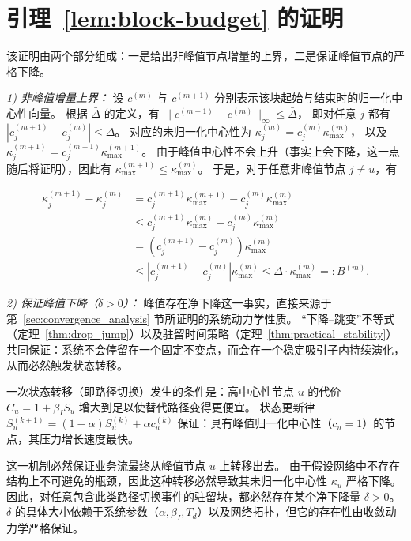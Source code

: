 \documentclass[journal]{IEEEtran}
\theoremstyle{plain}
\theoremstyle{definition}
\begin{document}

\section{引理~\ref{lem:block-budget} 的证明}
\label{app:proof_lem_block_budget}
\begin{IEEEproof}
该证明由两个部分组成：一是给出非峰值节点增量的上界，二是保证峰值节点的严格下降。

\noindent\textit{1) 非峰值增量上界：}
设 $c^{(m)}$ 与 $c^{(m+1)}$ 分别表示该块起始与结束时的归一化中心性向量。
根据 $\bar\Delta$ 的定义，有
$\|c^{(m+1)}-c^{(m)}\|_\infty \le \bar\Delta$，
即对任意 $j$ 都有
$|c^{(m+1)}_j - c^{(m)}_j| \le \bar\Delta$。
对应的未归一化中心性为
$\kappa^{(m)}_j = c^{(m)}_j \kappa^{(m)}_{\max}$，
以及
$\kappa^{(m+1)}_j = c^{(m+1)}_j \kappa^{(m+1)}_{\max}$。
由于峰值中心性不会上升（事实上会下降，这一点随后将证明），因此有
$\kappa^{(m+1)}_{\max} \le \kappa^{(m)}_{\max}$。
于是，对于任意非峰值节点 $j \neq u$，有

\begin{align*}
\kappa^{(m+1)}_j - \kappa^{(m)}_j &= c^{(m+1)}_j \kappa^{(m+1)}_{\max} - c^{(m)}_j \kappa^{(m)}_{\max} \\
&\le c^{(m+1)}_j \kappa^{(m)}_{\max} - c^{(m)}_j \kappa^{(m)}_{\max} \\
&= (c^{(m+1)}_j - c^{(m)}_j) \kappa^{(m)}_{\max} \\
&\le |c^{(m+1)}_j - c^{(m)}_j| \kappa^{(m)}_{\max} \le \bar\Delta \cdot \kappa^{(m)}_{\max} =: B^{(m)}.
\end{align*}

\noindent\textit{2) 保证峰值下降（$\delta>0$）：}
峰值存在净下降这一事实，直接来源于第~\ref{sec:convergence_analysis} 节所证明的系统动力学性质。
“下降--跳变”不等式（定理~\ref{thm:drop_jump}）以及驻留时间策略（定理~\ref{thm:practical_stability}）共同保证：系统不会停留在一个固定不变点，而会在一个稳定吸引子内持续演化，从而必然触发状态转移。

一次状态转移（即路径切换）发生的条件是：高中心性节点 $u$ 的代价
$C_u = 1 + \beta_I S_u$
增大到足以使替代路径变得更便宜。
状态更新律
$S_u^{(k+1)} = (1-\alpha)S_u^{(k)} + \alpha c_u^{(k)}$
保证：具有峰值归一化中心性（$c_u=1$）的节点，其压力增长速度最快。

这一机制必然保证业务流最终从峰值节点 $u$ 上转移出去。
由于假设网络中不存在结构上不可避免的瓶颈，因此这种转移必然导致其未归一化中心性 $\kappa_u$ 严格下降。
因此，对任意包含此类路径切换事件的驻留块，都必然存在某个净下降量 $\delta > 0$。
$\delta$ 的具体大小依赖于系统参数（$\alpha, \beta_I, T_d$）以及网络拓扑，但它的存在性由收敛动力学严格保证。
\end{IEEEproof}
\end{document}
